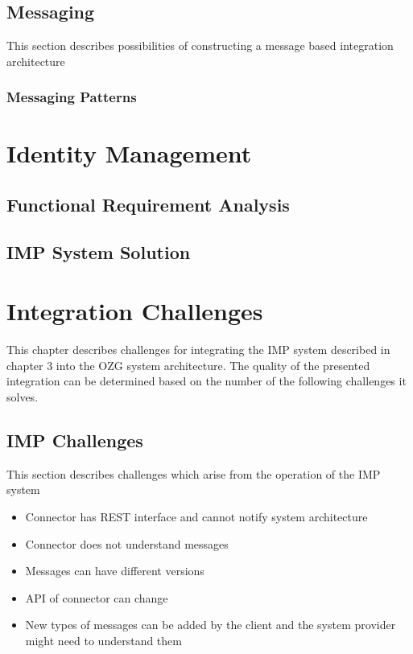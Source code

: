 \documentclass[
     12pt,         %
     a4paper,      %
     BCOR=10mm,version=first,     %
     DIV=14,version=first,        %
     ]{scrreprt}
\begin{document}
\section{Messaging}

This section describes possibilities of constructing a message based integration architecture

\subsection{Messaging Patterns}

\chapter{Identity Management}

\section{Functional Requirement Analysis}




\section{IMP System Solution}



\chapter{Integration Challenges}

This chapter describes challenges for integrating the IMP system described in chapter 3 into the OZG system architecture. The quality of the presented integration can be determined based on the number of the following challenges it solves.

\section{IMP Challenges}
This section describes challenges which arise from the operation of the IMP system

\begin{itemize}
    \item Connector has REST interface and cannot notify system architecture
    \item Connector does not understand messages
    \item Messages can have different versions
    \item API of connector can change
    \item New types of messages can be added by the client and the system provider might need to understand them
\end{itemize}
\end{document}
